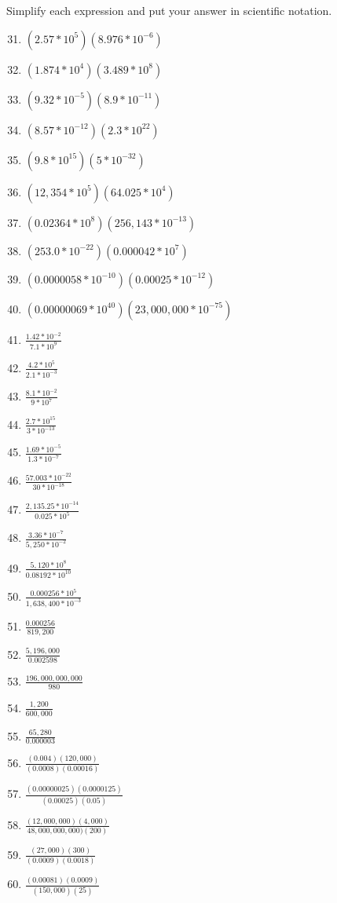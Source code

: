 \documentclass{article}
\begin{document}
Simplify each expression and put your answer in scientific notation.
\begin{enumerate}
\setcounter{enumi}{30}
\item $(2.57*10^{5})(8.976*10^{-6})$
\item $(1.874*10^{4})(3.489*10^{8})$
\item $(9.32*10^{-5})(8.9*10^{-11})$
\item $(8.57*10^{-12})(2.3*10^{22})$
\item $(9.8*10^{15})(5*10^{-32})$
\item $(12,354*10^{5})(64.025*10^{4})$
\item $(0.02364*10^{8})(256,143*10^{-13})$
\item $(253.0*10^{-22})(0.000042*10^{7})$
\item $(0.0000058*10^{-10})(0.00025*10^{-12})$
\item $(0.00000069*10^{40})(23,000,000*10^{-75})$
\item {\Large $\frac{1.42*10^{-2}}{7.1*10^{9}}$}
\item {\Large $\frac{4.2*10^{5}}{2.1*10^{-3}}$}
\item {\Large $\frac{8.1*10^{-2}}{9*10^{7}}$}
\item {\Large $\frac{2.7*10^{15}}{3*10^{-13}}$}
\item {\Large $\frac{1.69*10^{-5}}{1.3*10^{-7}}$}
\item {\Large $\frac{57.003*10^{-22}}{30*10^{-18}}$}
\item {\Large $\frac{2,135.25*10^{-14}}{0.025*10^{5}}$}
\item {\Large $\frac{3.36*10^{-7}}{5,250*10^{-2}}$}
\item {\Large $\frac{5,120*10^{8}}{0.08192*10^{10}}$}
\item {\Large $\frac{0.000256*10^{5}}{1,638,400*10^{-3}}$}
\item {\Large $\frac{0.000256}{819,200}$}
\item {\Large $\frac{5,196,000}{0.002598}$}
\item {\Large $\frac{196,000,000,000}{980}$}
\item {\Large $\frac{1,200}{600,000}$}
\item {\Large $\frac{65,280}{0.000003}$}
\item {\Large $\frac{(0.004)(120,000)}{(0.0008)(0.00016)}$}
\item {\Large $\frac{(0.00000025)(0.0000125)}{(0.00025)(0.05)}$}
\item {\Large $\frac{(12,000,000)(4,000)}{48,000,000,000)(200)}$}
\item {\Large $\frac{(27,000)(300)}{(0.0009)(0.0018)}$}
\item {\Large $\frac{(0.00081)(0.0009)}{(150,000)(25)}$}
\end{enumerate}
\end{document}
